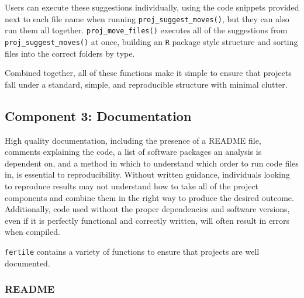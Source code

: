 \documentclass[12pt,twoside]{reedthesis}
\begin{document}
Users can execute these suggestions individually, using the code snippets provided next to each file name when running \texttt{proj\_suggest\_moves()}, but they can also run them all together. \texttt{proj\_move\_files()} executes all of the suggestions from \texttt{proj\_suggest\_moves()} at once, building an \texttt{R} package style structure and sorting files into the correct folders by type.

Combined together, all of these functions make it simple to ensure that projects fall under a standard, simple, and reproducible structure with minimal clutter.

\hypertarget{component-3-documentation}{%
\subsection{Component 3: Documentation}\label{component-3-documentation}}

High quality documentation, including the presence of a README file, comments explaining the code, a list of software packages an analysis is dependent on, and a method in which to understand which order to run code files in, is essential to reproducibility. Without written guidance, individuals looking to reproduce results may not understand how to take all of the project components and combine them in the right way to produce the desired outcome. Additionally, code used without the proper dependencies and software versions, even if it is perfectly functional and correctly written, will often result in errors when compiled.

\texttt{fertile} contains a variety of functions to ensure that projects are well documented.

\hypertarget{readme}{%
\subsubsection{README}\label{readme}}
\end{document}
